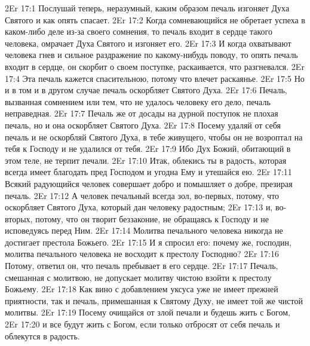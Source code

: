 \vs 2Er 17:1
Послушай теперь,
неразумный, каким образом печаль изгоняет Духа Святого и как опять спасает.
\vs 2Er 17:2
Когда сомневающийся не
обретает успеха в каком-либо деле из-за своего сомнения, то печаль входит в
сердце такого человека, омрачает Духа Святого и изгоняет его.
\vs 2Er 17:3
И когда охватывают
человека гнев и сильное раздражение по какому-нибудь поводу, то опять печаль
входит в сердце, он скорбит о своем поступке, раскаивается, что разгневался.
\vs 2Er 17:4
Эта печаль кажется
спасительною, потому что влечет раскаянье.
\vs 2Er 17:5
Но и в том и в другом
случае печаль оскорбляет Святого Духа.
\vs 2Er 17:6
Печаль, вызванная
сомнением или тем, что не удалось человеку его дело, печаль неправедная.
\vs 2Er 17:7
Печаль же от досады на
дурной поступок не плохая печаль, но и она оскорбляет Святого Духа.
\vs 2Er 17:8
Посему удаляй от себя
печаль и не оскорбляй Святого Духа, в тебе живущего, чтобы он не возроптал на
тебя к Господу и не удалился от тебя.
\vs 2Er 17:9
Ибо Дух Божий, обитающий в
этом теле, не терпит печали.
\vs 2Er 17:10
Итак, облекись ты в
радость, которая всегда имеет благодать пред Господом и угодна Ему и утешайся
ею.
\vs 2Er 17:11
Всякий радующийся человек
совершает добро и помышляет о добре, презирая печаль.
\vs 2Er 17:12
А человек печальный
всегда зол, во-первых, потому, что оскорбляет Святого Духа, который дан
человеку радостным;
\vs 2Er 17:13
и, во-вторых, потому, что
он творит беззаконие, не обращаясь к Господу и не исповедуясь перед Ним.
\vs 2Er 17:14
Молитва печального
человека никогда не достигает престола Божьего.
\vs 2Er 17:15
И я спросил его: почему
же, господин, молитва печального человека не восходит к престолу Господню?
\vs 2Er 17:16
Потому, ответил он,
что печаль пребывает в его сердце.
\vs 2Er 17:17
Печаль, смешанная с
молитвою, не допускает молитву чистою взойти к престолу Божьему.
\vs 2Er 17:18
Как вино с добавлением
уксуса уже не имеет прежней приятности, так и печаль, примешанная к Святому
Духу, не имеет той же чистой молитвы.
\vs 2Er 17:19
Посему очищайся от злой
печали и будешь жить с Богом,
\vs 2Er 17:20
и все будут жить с Богом,
если только отбросят от себя печаль и облекутся в радость.


